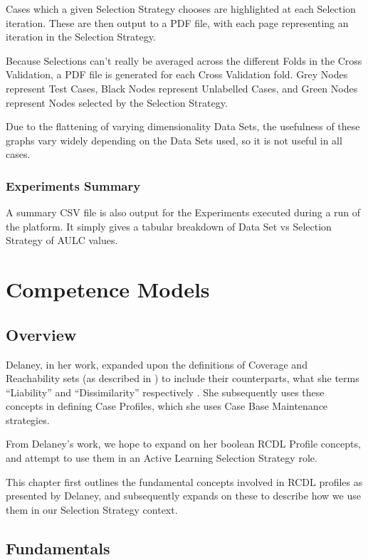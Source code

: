 \documentclass[a4paper,11pt]{report}
\begin{document}
Cases which a given Selection Strategy chooses are highlighted at each Selection iteration. These are then output to a PDF file, with each page representing an iteration in the Selection Strategy.

Because Selections can't really be averaged across the different Folds in the Cross Validation, a PDF file is generated for each Cross Validation fold. Grey Nodes represent Test Cases, Black Nodes represent Unlabelled Cases, and Green Nodes represent Nodes selected by the Selection Strategy.

Due to the flattening of varying dimensionality Data Sets, the usefulness of these graphs vary widely depending on the Data Sets used, so it is not useful in all cases.

\subsection{Experiments Summary}
A summary CSV file is also output for the Experiments executed during a run of the platform. It simply gives a tabular breakdown of Data Set vs Selection Strategy of AULC values.

\chapter{Competence Models\label{cha:CompetenceModels}}
\section{Overview}

Delaney, in her work, expanded upon the definitions of Coverage and Reachability sets (as described in \citep{Smyth1995}) to include their counterparts, what she terms ``Liability'' and ``Dissimilarity'' respectively \cite{Delany2009}. She subsequently uses these concepts in defining Case Profiles, which she uses Case Base Maintenance strategies.

From Delaney's work, we hope to expand on her boolean RCDL Profile concepts, and attempt to use them in an Active Learning Selection Strategy role.

This chapter first outlines the fundamental concepts involved in RCDL profiles as presented by Delaney, and subsequently expands on these to describe how we use them in our Selection Strategy context.

\section{Fundamentals}
\end{document}
